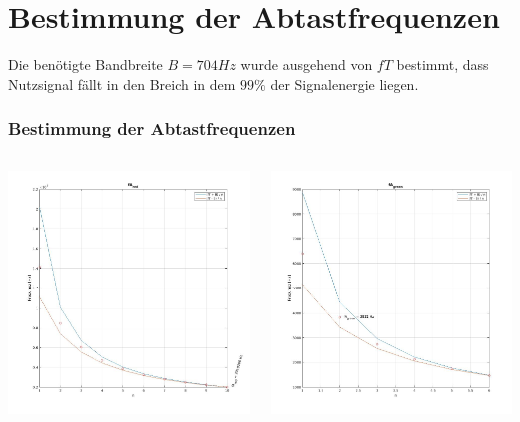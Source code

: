 \documentclass{beamer}
\begin{document}
\section{Bestimmung der Abtastfrequenzen}
\begin{frame}
  Die benötigte Bandbreite $B = 704Hz$ wurde ausgehend von $fT$ bestimmt, dass Nutzsignal fällt in den Breich
  in dem $99\%$ der Signalenergie liegen.
  \frametitle{Bestimmung der Abtastfrequenzen}
  \begin{columns}
    \begin{column}{0.5\textwidth}
      \includegraphics[width=\textwidth, height=0.7\textheight]{images/fAred.jpg}
    \end{column}
    \begin{column}{0.5\textwidth}
      \includegraphics[width=\textwidth, height=0.7\textheight]{images/fAgreen.jpg}

\end{column}
\end{columns}
\end{frame}
\end{document}
